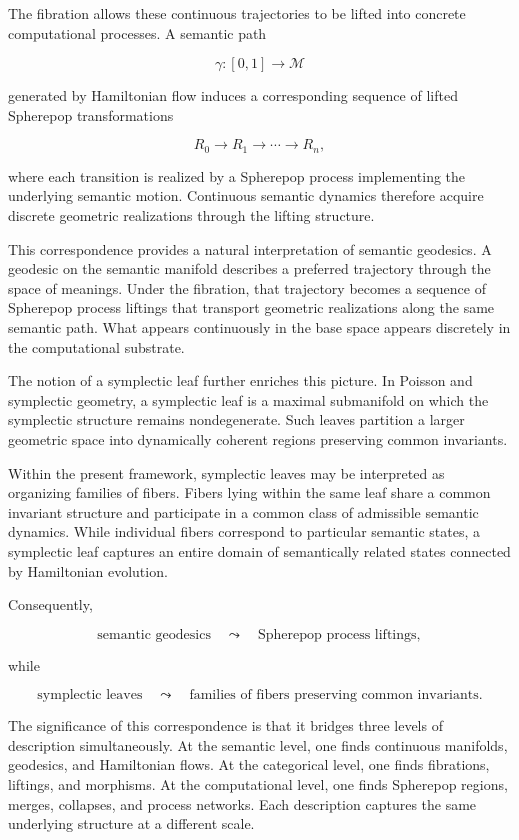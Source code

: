 \documentclass[12pt,letterpaper]{article}
\theoremstyle{remark}
\begin{document}
The fibration allows these continuous trajectories to be lifted into concrete computational processes. A semantic path

\[
\gamma : [0,1] \to \mathcal{M}
\]

generated by Hamiltonian flow induces a corresponding sequence of lifted Spherepop transformations

\[
R_0
\to
R_1
\to
\cdots
\to
R_n,
\]

where each transition is realized by a Spherepop process implementing the underlying semantic motion. Continuous semantic dynamics therefore acquire discrete geometric realizations through the lifting structure.

This correspondence provides a natural interpretation of semantic geodesics. A geodesic on the semantic manifold describes a preferred trajectory through the space of meanings. Under the fibration, that trajectory becomes a sequence of Spherepop process liftings that transport geometric realizations along the same semantic path. What appears continuously in the base space appears discretely in the computational substrate.

The notion of a symplectic leaf further enriches this picture. In Poisson and symplectic geometry, a symplectic leaf is a maximal submanifold on which the symplectic structure remains nondegenerate. Such leaves partition a larger geometric space into dynamically coherent regions preserving common invariants.

Within the present framework, symplectic leaves may be interpreted as organizing families of fibers. Fibers lying within the same leaf share a common invariant structure and participate in a common class of admissible semantic dynamics. While individual fibers correspond to particular semantic states, a symplectic leaf captures an entire domain of semantically related states connected by Hamiltonian evolution.

Consequently,

\[
\text{semantic geodesics}
\quad\leadsto\quad
\text{Spherepop process liftings},
\]

while

\[
\text{symplectic leaves}
\quad\leadsto\quad
\text{families of fibers preserving common invariants}.
\]

The significance of this correspondence is that it bridges three levels of description simultaneously. At the semantic level, one finds continuous manifolds, geodesics, and Hamiltonian flows. At the categorical level, one finds fibrations, liftings, and morphisms. At the computational level, one finds Spherepop regions, merges, collapses, and process networks. Each description captures the same underlying structure at a different scale.
\end{document}
